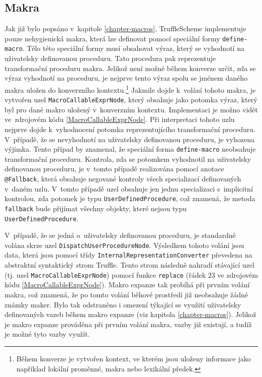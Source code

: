 \documentclass[
  master,
  biblatex,
  figures=true,
  theorems,
  sourcecodes,
  glossaries,
  index
]{kidiplom}
\begin{document}
\subsection{Makra}
\label{chapter-macros-implementation}
Jak již bylo popsáno v~kapitole \ref{chapter-macros}, TruffleScheme implementuje pouze nehygienická makra, která lze definovat pomocí speciální formy \texttt{define-macro}. Tělo této speciální formy musí obsahovat výraz, který se vyhodnotí na uživatelsky definovanou proceduru. Tato procedura pak reprezentuje transformační proceduru makra. Jelikož není možné během konverze určit, zda se výraz vyhodnotí na proceduru, je nejprve tento výraz spolu se jménem daného makra uložen do konverzního kontextu.\footnote{Během konverze je vytvořen kontext, ve kterém jsou uloženy informace jako například lokální proměnné, makra nebo lexikální předek.} Jakmile dojde k~volání tohoto makra, je vytvořen uzel \texttt{MacroCallableExprNode}, který obsahuje jako potomka výraz, který byl pro dané makro uložený v~konverzním kontextu. Implementaci je možno vidět ve~zdrojovém kódu \ref{MacroCallableExprNode}. Při interpretaci tohoto uzlu nejprve dojde k~vyhodnocení potomka reprezentujícího transformační proceduru. V~případě, že se nevyhodnotí na uživatelsky definovanou proceduru, je vyhozena výjimka. Tento případ by znamenal, že speciální forma \texttt{define-macro} neobsahuje transformační proceduru. Kontrola, zda se potomkem vyhodnotil na uživatelsky definovanou proceduru, je v~tomto případě realizována pomocí anotace \texttt{@Fallback}, která obsahuje negované kontroly všech specializací definovaných v~daném uzlu. V~tomto případě uzel obsahuje jen jednu specializaci s~implicitní kontrolou, zda potomek je typu \texttt{UserDefinedProcedure}, což znamená, že metoda \texttt{fallback} bude přijímat všechny objekty, které nejsou typu \texttt{UserDefinedProcedure}.

V~případě, že se jedná o~uživatelsky definovanou proceduru, je standardně volána skrze uzel \texttt{DispatchUserProcedureNode}. Výsledkem tohoto volání jsou data, která jsou pomocí třídy \texttt{InternalRepresentationConverter} převedena na abstraktní syntaktický strom Truffle. Tento strom následně nahradí stávající uzel (tj. uzel \texttt{MacroCallableExprNode}) pomocí funkce \texttt{replace} (řádek 23 ve zdrojovém kódu \ref{MacroCallableExprNode}). Makro expanze tak probíhá při prvním volání makra, což znamená, že po tomto volání běhové prostředí již neobsahuje žádné známky maker. Bylo tak odstraněno i omezení týkající se využití uživatelsky definovaných vazeb během makro expanze (viz kapitola \ref{chapter-macros}). Jelikož je makro expanze prováděna při prvním volání makra, vazby již existují, a tudíž je možné tyto vazby využít.
\end{document}
